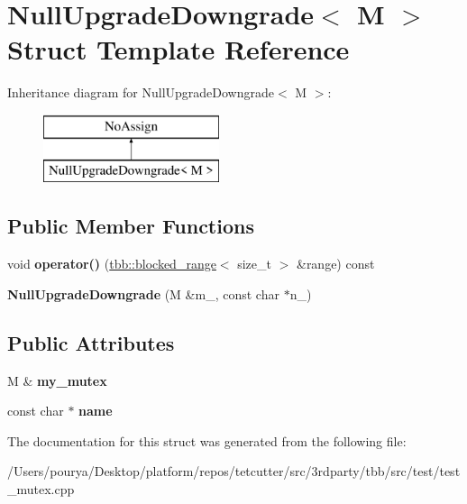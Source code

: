 \hypertarget{structNullUpgradeDowngrade}{}\section{Null\+Upgrade\+Downgrade$<$ M $>$ Struct Template Reference}
\label{structNullUpgradeDowngrade}
Inheritance diagram for Null\+Upgrade\+Downgrade$<$ M $>$\+:\begin{figure}[H]
\begin{center}
\leavevmode
\includegraphics[height=2.000000cm]{structNullUpgradeDowngrade}
\end{center}
\end{figure}
\subsection*{Public Member Functions}
\begin{DoxyCompactItemize}
\item 
\hypertarget{structNullUpgradeDowngrade_ab4ceff3f04eb05aa88c63dfd51cdd9e1}{}void {\bfseries operator()} (\hyperlink{classtbb_1_1blocked__range}{tbb\+::blocked\+\_\+range}$<$ size\+\_\+t $>$ \&range) const \label{structNullUpgradeDowngrade_ab4ceff3f04eb05aa88c63dfd51cdd9e1}

\item 
\hypertarget{structNullUpgradeDowngrade_a976c02a4d231e4548b91df3f978b7d36}{}{\bfseries Null\+Upgrade\+Downgrade} (M \&m\+\_\+, const char $\ast$n\+\_\+)\label{structNullUpgradeDowngrade_a976c02a4d231e4548b91df3f978b7d36}

\end{DoxyCompactItemize}
\subsection*{Public Attributes}
\begin{DoxyCompactItemize}
\item 
\hypertarget{structNullUpgradeDowngrade_a22b9202f4a430a3cf8c0dc504383a311}{}M \& {\bfseries my\+\_\+mutex}\label{structNullUpgradeDowngrade_a22b9202f4a430a3cf8c0dc504383a311}

\item 
\hypertarget{structNullUpgradeDowngrade_af3fabb3d5526eef8e61f81b39ed0d962}{}const char $\ast$ {\bfseries name}\label{structNullUpgradeDowngrade_af3fabb3d5526eef8e61f81b39ed0d962}

\end{DoxyCompactItemize}


The documentation for this struct was generated from the following file\+:\begin{DoxyCompactItemize}
\item 
/\+Users/pourya/\+Desktop/platform/repos/tetcutter/src/3rdparty/tbb/src/test/test\+\_\+mutex.\+cpp\end{DoxyCompactItemize}
